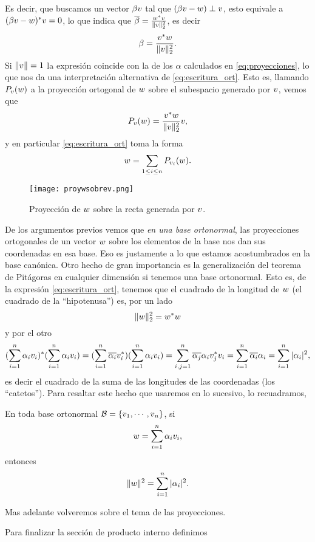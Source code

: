 Es decir, que buscamos un vector $\beta\vb$
 tal que $(\beta\vb -\wb)\perp \vb$, esto equivale a
 $(\beta\vb -\wb)^* \vb=0$, lo que indica que $\overline{\beta}=\frac{\wb^*\vb}{\|\vb\|_2^2}$, es decir
 $$
 \beta=\frac{\vb^*\wb}{\|\vb\|_2^2}.
 $$
 Si $\|\vb\|=1$ la expresión coincide con la de los $\alpha$ calculados en \eqref{eq:proyecciones}, lo que nos da una interpretación alternativa de \eqref{eq:escritura_ort}. Esto es, llamando
 $\Pb_{\vb}(\wb)$ a la proyección ortogonal de $\wb$ sobre el subespacio generado por $\vb$, vemos que
\begin{equation}
 \label{eq:proy_forma1}
 \Pb_{\vb}(\wb)=\frac{\vb^*\wb}{\|\vb\|_2^2}\vb,
\end{equation}
y en particular \eqref{eq:escritura_ort} toma la forma
 $$
 \wb=\sum_{1\le i\le n}\Pb_{\vb_i}(\wb).
 $$

\begin{figure}
\texttt{[image: proywsobrev.png]}
\caption{Proyección de $\wb$ sobre la recta generada por $\vb$.}
 \label{fig:proyusobrev}
\end{figure}

\tcc
De los argumentos previos vemos que \emph{en una base ortonormal}, las proyecciones ortogonales de un vector $\wb$ sobre los elementos de la base nos dan sus coordenadas en esa base. Eso  es justamente a lo que estamos acostumbrados en la base can\'onica.
\etcc
Otro hecho de gran importancia es la generalización del teorema de Pitágoras en cualquier dimensión si tenemos una base ortonormal. Esto es, de la expresión \eqref{eq:escritura_ort}, tenemos que el cuadrado de la longitud de $\wb$ (el cuadrado de la ``hipotenusa'') es, por un lado
$$\|\wb\|^2_2=\wb^*\wb$$ y por el otro
$$
(\sum_{i=1}^n\alpha_i\vb_i)^*(\sum_{i=1}^n\alpha_i\vb_i)=(\sum_{i=1}^n\overline{\alpha_i}\vb_i^*)(\sum_{i=1}^n\alpha_i\vb_i)=
\sum_{i,j=1}^n\overline{\alpha_j}\alpha_i\vb_j^*\vb_i=\sum_{i=1}^n\overline{\alpha_i}\alpha_i=\sum_{i=1}^n|\alpha_i|^2,
$$
es decir el cuadrado de la suma de las longitudes de las coordenadas (los ``catetos'').
Para resaltar este hecho que usaremos en lo sucesivo, lo recuadramos,
\tcc
\begin{rem}
\label{obs:pitagoras}
En toda base ortonormal $\mathcal{B}=\{\vb_1,\cdots,\vb_n\}$, si
$$
\wb=\sum_{i=1}^n\alpha_i\vb_i,
$$
entonces
$$
\|\wb\|^2=\sum_{i=1}^n|\alpha_i|^2.
$$
\end{rem}
\etcc
Mas adelante volveremos sobre el tema de las proyecciones.

Para finalizar la sección de producto interno definimos

